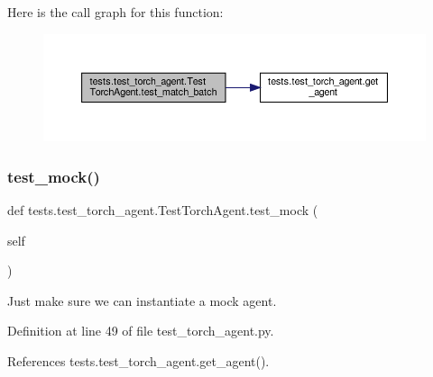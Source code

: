Here is the call graph for this function\+:
\nopagebreak
\begin{figure}[H]
\begin{center}
\leavevmode
\includegraphics[width=350pt]{classtests_1_1test__torch__agent_1_1TestTorchAgent_abe59ca8c2f6927c0ba6f0e5ce7d3a4f2_cgraph}
\end{center}
\end{figure}
\mbox{\label{classtests_1_1test__torch__agent_1_1TestTorchAgent_a0a7c1df7d947bdc260afa6dad21d78b9}} 
\subsubsection{\texorpdfstring{test\+\_\+mock()}{test\_mock()}}
{\footnotesize\ttfamily def tests.\+test\+\_\+torch\+\_\+agent.\+Test\+Torch\+Agent.\+test\+\_\+mock (\begin{DoxyParamCaption}\item[{}]{self }\end{DoxyParamCaption})}

\begin{DoxyVerb}Just make sure we can instantiate a mock agent.\end{DoxyVerb}
 

Definition at line 49 of file test\+\_\+torch\+\_\+agent.\+py.



References tests.\+test\+\_\+torch\+\_\+agent.\+get\+\_\+agent().

